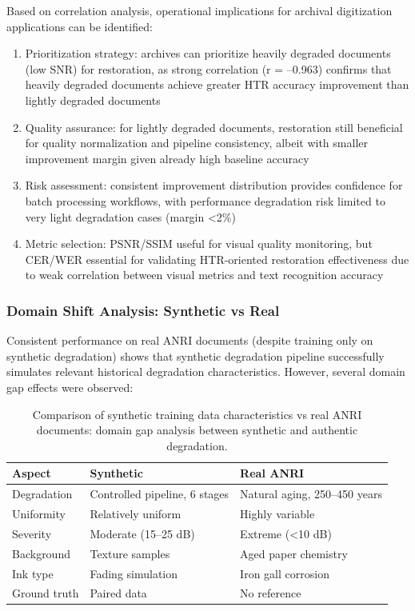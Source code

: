 \documentclass[journal]{IEEEtran}
\begin{document}
Based on correlation analysis, operational implications for archival digitization applications can be identified:

\begin{enumerate}
    \item Prioritization strategy: archives can prioritize heavily degraded documents (low SNR) for restoration, as strong correlation (r = --0.963) confirms that heavily degraded documents achieve greater HTR accuracy improvement than lightly degraded documents
    \item Quality assurance: for lightly degraded documents, restoration still beneficial for quality normalization and pipeline consistency, albeit with smaller improvement margin given already high baseline accuracy
    \item Risk assessment: consistent improvement distribution provides confidence for batch processing workflows, with performance degradation risk limited to very light degradation cases (margin <2\%)
    \item Metric selection: PSNR/SSIM useful for visual quality monitoring, but CER/WER essential for validating HTR-oriented restoration effectiveness due to weak correlation between visual metrics and text recognition accuracy
\end{enumerate}

\subsubsection{Domain Shift Analysis: Synthetic vs Real}

Consistent performance on real ANRI documents (despite training only on synthetic degradation) shows that synthetic degradation pipeline successfully simulates relevant historical degradation characteristics. However, several domain gap effects were observed:

\begin{table}[!t]
\renewcommand{\arraystretch}{1.15}
\caption{Comparison of synthetic training data characteristics vs real ANRI documents: domain gap analysis between synthetic and authentic degradation.}
\label{table:synthetic_vs_real_comparison}
\centering
\small
\begin{tabular}{|p{1.8cm}|p{2.0cm}|p{2.0cm}|}
\hline
\textbf{Aspect} & \textbf{Synthetic} & \textbf{Real ANRI} \\
\hline
Degradation & Controlled pipeline, 6 stages & Natural aging, 250--450 years \\
\hline
Uniformity & Relatively uniform & Highly variable \\
\hline
Severity & Moderate (15--25 dB) & Extreme (<10 dB) \\
\hline
Background & Texture samples & Aged paper chemistry \\
\hline
Ink type & Fading simulation & Iron gall corrosion \\
\hline
Ground truth & Paired data & No reference \\
\hline
\end{tabular}
\end{table}
\end{document}
